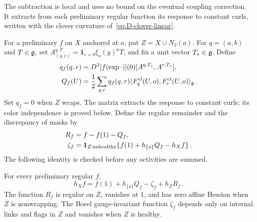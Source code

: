 The subtraction is local and uses no bound on the eventual coupling correction. It extracts from each preliminary regular function its response to constant curls, written with the clover curvature of~\eqref{eq:D-clover-linear}.

For a preliminary $f$ on $X$ anchored at $o$, put $Z=X\cup N_2(o)$. For $q=(a,b)$ and $T\in\mathfrak{g}$, set $A^{q,T}_{(y,c)}=\mathbf1_{c=b}\xi_o(y)^aT$, and fix a unit vector $T_*\in\mathfrak{g}$. Define
\begin{align*}
q_f(q,r)&=D^2[f(\exp\cdot)](0)[A^{q,T_*},A^{r,T_*}],\\
Q_f(U)&=\frac12\sum_{q,r}q_f(q,r)\langle F^{\rm cl}_q(U,o),F^{\rm cl}_r(U,o)\rangle_{\mathfrak{g}}\,.
\end{align*}
Set $q_f=0$ when $Z$ wraps. The matrix extracts the response to constant curls; its color independence is proved below. Define the regular remainder and the discrepancy of masks by
\begin{align}\label{eq:D-local-split}
R_f&=f-f(1)-Q_f,\notag\\
\zeta_f&=\mathbf1_{Z\,\mathrm{unhealthy}}\{f(1)+h_{\{o\}}Q_f-h_Xf\}\,.
\end{align}
The following identity is checked before any activities are summed.

\begin{lemma}\label{lem:D-local-subtraction}
For every preliminary regular $f$,
\begin{equation*}
h_Xf=f(1)+h_{\{o\}}Q_f-\zeta_f+h_ZR_f\,.
\end{equation*}
The function $R_f$ is regular on $Z$, vanishes at $1$, and has zero affine Hessian when $Z$ is nonwrapping. The Borel gauge-invariant function $\zeta_f$ depends only on internal links and flags in $Z$ and vanishes when $Z$ is healthy.
\end{lemma}

